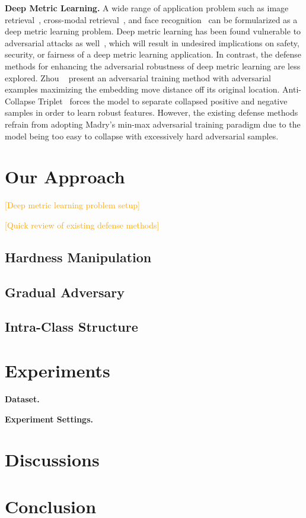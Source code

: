 \documentclass[10pt,twocolumn,letterpaper]{article}
\newcommand{\oo}[1]{\textcolor{orange}{#1}}
\begin{document}
\textbf{Deep Metric Learning.}
%
A wide range of application problem such as image retrieval~\cite{imagesim2},
cross-modal retrieval~\cite{ladderloss}, and face recognition~\cite{facenet}
can be formularized as a deep metric learning problem.
%
Deep metric learning has been found vulnerable to adversarial attacks as
well~\cite{advrank,advorder}, which will result in undesired
implications on safety, security, or fairness of a deep metric learning
application.
%
In contrast, the defense methods for enhancing the adversarial robustness of deep
metric learning are less explored.
%
Zhou \etal~\cite{advrank} present an adversarial training method with adversarial
examples maximizing the embedding move distance off its original location.
%
Anti-Collapse Triplet~\cite{robrank} forces the model
to separate collapsed positive and negative samples in order to learn
robust features.
%
However, the existing defense methods refrain from adopting Madry's min-max
adversarial training paradigm due to the model being too easy to collapse
with excessively hard adversarial samples.


\section{Our Approach}
\label{sec:3}

\oo{[Deep metric learning problem setup]}

\oo{[Quick review of existing defense methods]}

\subsection{Hardness Manipulation}

\subsection{Gradual Adversary}

\subsection{Intra-Class Structure}

\section{Experiments}
\label{sec:4}

\textbf{Dataset.}

\textbf{Experiment Settings.}

\section{Discussions}
\label{sec:5}



\section{Conclusion}
\label{sec:6}

\cite{Authors14}

{\small


}


\end{document}
